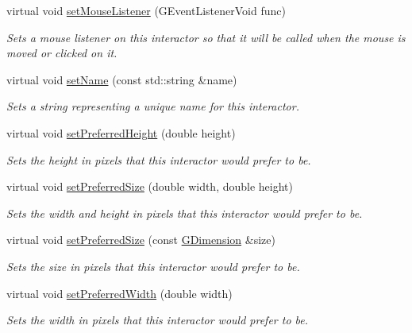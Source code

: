 \begin{DoxyCompactItemize}
virtual void \mbox{\hyperlink{classGInteractor_aea7f647ea62d59f71b5fad6aa65eeaf9}{set\+Mouse\+Listener}} (G\+Event\+Listener\+Void func)
\begin{DoxyCompactList}\small\item\em Sets a mouse listener on this interactor so that it will be called when the mouse is moved or clicked on it. \end{DoxyCompactList}\item 
virtual void \mbox{\hyperlink{classGInteractor_a9d3a2685df23b5e7cbf59c19c4a1f9b5}{set\+Name}} (const std\+::string \&name)
\begin{DoxyCompactList}\small\item\em Sets a string representing a unique name for this interactor. \end{DoxyCompactList}\item 
virtual void \mbox{\hyperlink{classGInteractor_a1ab987704fce32098706c6f00fb08218}{set\+Preferred\+Height}} (double height)
\begin{DoxyCompactList}\small\item\em Sets the height in pixels that this interactor would prefer to be. \end{DoxyCompactList}\item 
virtual void \mbox{\hyperlink{classGInteractor_a042c5ae19430d765ef552371cae3632c}{set\+Preferred\+Size}} (double width, double height)
\begin{DoxyCompactList}\small\item\em Sets the width and height in pixels that this interactor would prefer to be. \end{DoxyCompactList}\item 
virtual void \mbox{\hyperlink{classGInteractor_aa22d9be4bc0e078bb0ea69b0fc9d7c75}{set\+Preferred\+Size}} (const \mbox{\hyperlink{structGDimension}{G\+Dimension}} \&size)
\begin{DoxyCompactList}\small\item\em Sets the size in pixels that this interactor would prefer to be. \end{DoxyCompactList}\item 
virtual void \mbox{\hyperlink{classGInteractor_a3db429ab2fa52efd187eec0ed8cdd9f2}{set\+Preferred\+Width}} (double width)
\begin{DoxyCompactList}\small\item\em Sets the width in pixels that this interactor would prefer to be. \end{DoxyCompactList}\item 

\end{DoxyCompactItemize}
